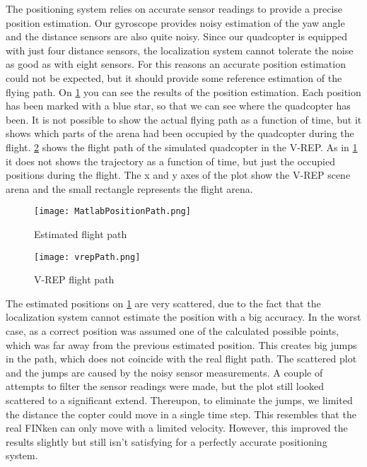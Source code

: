 The positioning system relies on accurate sensor readings to provide a precise position estimation. 
Our gyroscope provides noisy estimation of the yaw angle and the distance sensors are also quite noisy. 
Since our quadcopter is equipped with just four distance sensors, the localization system cannot tolerate the noise as good as with eight sensors. 
For this reasons an accurate position estimation could not be expected, but it should provide some reference estimation of the flying path. 
On \ref{fig:matlabPosPath} you can see the results of the position estimation. 
Each position has been marked with a blue star, so that we can see where the quadcopter has been. 
It is not possible to show the actual flying path as a function of time, but it shows which parts of the arena had been occupied by the quadcopter during the flight. 
\ref{fig:vrepPosPath} shows the flight path of the simulated quadcopter in the V-REP. 
As in \ref{fig:matlabPosPath} it does not shows the trajectory as a function of time, but just the occupied positions during the flight. 
The x and y axes of the plot show the V-REP scene arena and the small rectangle represents the flight arena.

\begin{figure}[h!]
 \begin{center}
  \texttt{[image: MatlabPositionPath.png]}
 \end{center}
  \caption{Estimated flight path\label{fig:matlabPosPath}}
\end{figure}

\begin{figure}[h!]
 \begin{center}
  \texttt{[image: vrepPath.png]}
 \end{center}
  \caption{V-REP flight path\label{fig:vrepPosPath}}
\end{figure}

The estimated positions on \ref{fig:matlabPosPath} are very scattered, due to the fact that the localization system cannot estimate the position with a big accuracy. 
In the worst case, as a correct position was assumed one of the calculated possible points, which was far away from the previous estimated position. 
This creates  big jumps in the path, which does not coincide with the real flight path. 
The scattered plot and the jumps are caused by the noisy sensor measurements. 
A couple of attempts to filter the sensor readings were made, but the plot still looked scattered to a significant extend. 
Thereupon, to eliminate the jumps, we limited the distance the copter could move in a single time step.
This resembles that the real FINken can only move with a limited velocity.
However, this improved the results slightly but still isn't satisfying for a perfectly accurate positioning system.


